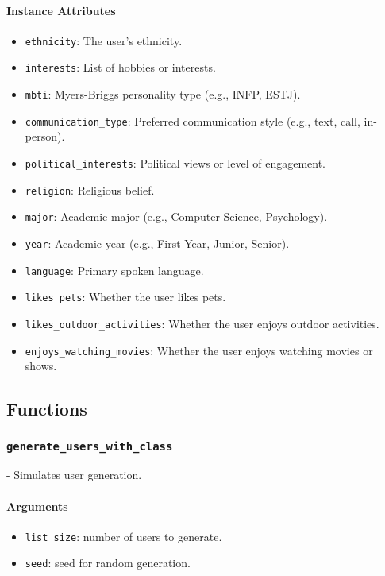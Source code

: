 \documentclass[fontsize=11pt]{article}
\begin{document}
\paragraph{Instance Attributes}
\begin{itemize}
    \item \texttt{ethnicity}: The user's ethnicity.
    \item \texttt{interests}: List of hobbies or interests.
    \item \texttt{mbti}: Myers-Briggs personality type (e.g., INFP, ESTJ).
    \item \texttt{communication\_type}: Preferred communication style (e.g., text, call, in-person).
    \item \texttt{political\_interests}: Political views or level of engagement.
    \item \texttt{religion}: Religious belief.
    \item \texttt{major}: Academic major (e.g., Computer Science, Psychology).
    \item \texttt{year}: Academic year (e.g., First Year, Junior, Senior).
    \item \texttt{language}: Primary spoken language.
    \item \texttt{likes\_pets}: Whether the user likes pets.
    \item \texttt{likes\_outdoor\_activities}: Whether the user enjoys outdoor activities.
    \item \texttt{enjoys\_watching\_movies}: Whether the user enjoys watching movies or shows.
\end{itemize}

\subsection*{Functions}

\subsubsection*{\texttt{generate\_users\_with\_class}}
- Simulates user generation.

\paragraph{Arguments}
\begin{itemize}
    \item \texttt{list\_size}: number of users to generate.
    \item \texttt{seed}: seed for random generation.
\end{itemize}
\end{document}
